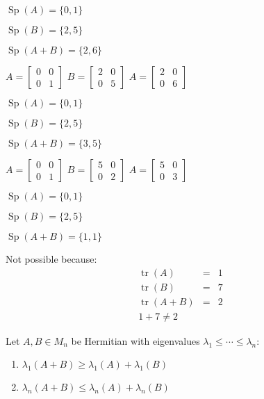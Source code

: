 \documentclass[letterpaper,12pt,fleqn]{article}
\renewcommand{\l}{\lambda}
\DeclareMathOperator{\tr}{tr}
\DeclareMathOperator{\Sp}{Sp}
\begin{document}
\begin{example}
  $\Sp(A)=\{0,1\}$

  $\Sp(B)=\{2,5\}$

  $\Sp(A+B)=\{2,6\}$

  $A=\begin{bmatrix} 0 & 0 \\ 0 & 1 \end{bmatrix}$\hspace{4ex}
  $B=\begin{bmatrix} 2 & 0 \\ 0 & 5 \end{bmatrix}$\hspace{4ex}
  $A=\begin{bmatrix} 2 & 0 \\ 0 & 6 \end{bmatrix}$

  \bigskip

  $\Sp(A)=\{0,1\}$

  $\Sp(B)=\{2,5\}$

  $\Sp(A+B)=\{3,5\}$

  $A=\begin{bmatrix} 0 & 0 \\ 0 & 1 \end{bmatrix}$\hspace{4ex}
  $B=\begin{bmatrix} 5 & 0 \\ 0 & 2 \end{bmatrix}$\hspace{4ex}
  $A=\begin{bmatrix} 5 & 0 \\ 0 & 3 \end{bmatrix}$

\newpage

  $\Sp(A)=\{0,1\}$

  $\Sp(B)=\{2,5\}$

  $\Sp(A+B)=\{1,1\}$

  Not possible because:
  \begin{eqnarray*}
    \tr(A) &=& 1 \\
    \tr(B) &=& 7 \\
    \tr(A+B) &=& 2 \\
    1+7\ne2
  \end{eqnarray*}
\end{example}

\begin{lemma}
  Let $A,B\in M_n$ be Hermitian with eigenvalues $\l_1\le\cdots\le\l_n$:
  \begin{enumerate}
  \item $\l_1(A+B)\ge\l_1(A)+\l_1(B)$
  \item $\l_n(A+B)\le\l_n(A)+\l_n(B)$
  \end{enumerate}
\end{lemma}
\end{document}
